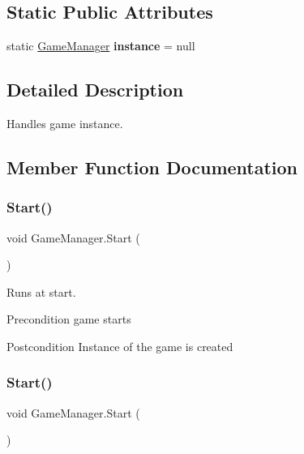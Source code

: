 \subsection*{Static Public Attributes}
\begin{DoxyCompactItemize}
\item 
\mbox{\label{class_game_manager_a79c994e11ff8d352afddd9e09f15dbf2}} 
static \mbox{\hyperlink{class_game_manager}{Game\+Manager}} {\bfseries instance} = null
\end{DoxyCompactItemize}


\subsection{Detailed Description}
Handles game instance. 

\subsection{Member Function Documentation}
\mbox{\label{class_game_manager_a5ccfacd027ad08eeb4ff1f25a7f59c98}} 
\subsubsection{\texorpdfstring{Start()}{Start()}\hspace{0.1cm}{\footnotesize\ttfamily [1/2]}}
{\footnotesize\ttfamily void Game\+Manager.\+Start (\begin{DoxyParamCaption}{ }\end{DoxyParamCaption})\hspace{0.3cm}{\ttfamily [inline]}}

Runs at start. \begin{DoxyPrecond}{Precondition}
game starts 
\end{DoxyPrecond}
\begin{DoxyPostcond}{Postcondition}
Instance of the game is created 
\end{DoxyPostcond}
\mbox{\label{class_game_manager_a5ccfacd027ad08eeb4ff1f25a7f59c98}} 
\subsubsection{\texorpdfstring{Start()}{Start()}\hspace{0.1cm}{\footnotesize\ttfamily [2/2]}}
{\footnotesize\ttfamily void Game\+Manager.\+Start (\begin{DoxyParamCaption}{ }\end{DoxyParamCaption})\hspace{0.3cm}{\ttfamily [inline]}}

